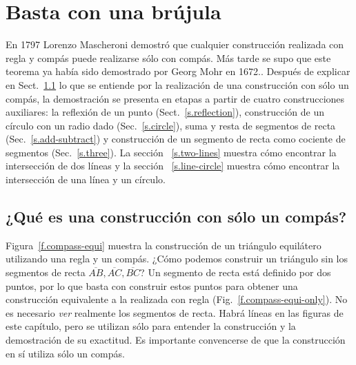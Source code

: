 
\chapter{Basta con una brújula}\label{c.compass}


En 1797 Lorenzo Mascheroni demostró que cualquier construcción realizada con regla y compás puede realizarse sólo con compás. Más tarde se supo que este teorema ya había sido demostrado por Georg Mohr en 1672..
Después de explicar en Sect.~\ref{s.compass-what} lo que se entiende por la realización de una construcción con sólo un compás, la demostración se presenta en etapas a partir de cuatro construcciones auxiliares: la reflexión de un punto (Sect.~\ref{s.reflection}), construcción de un círculo con un radio dado (Sec.~\ref{s.circle}), suma y resta de segmentos de recta (Sec.~\ref{s.add-subtract}) y construcción de un segmento de recta como cociente de segmentos (Sec.~\ref{s.three}). La sección ~\ref{s.two-lines} muestra cómo encontrar la intersección de dos líneas y la sección ~\ref{s.line-circle} muestra cómo encontrar la intersección de una línea y un círculo.

\section{¿Qué es una construcción con sólo un compás?}\label{s.compass-what}

Figura~\ref{f.compass-equi} muestra la construcción de un triángulo equilátero utilizando una regla y un compás. ¿Cómo podemos construir un triángulo sin los segmentos de recta $\overline{AB}, \overline{AC}, \overline{BC}$? Un segmento de recta está definido por dos puntos, por lo que basta con construir estos puntos para obtener una construcción equivalente a la realizada con regla (Fig.~\ref{f.compass-equi-only}). No es necesario \emph{ver} realmente los segmentos de recta.
Habrá líneas en las figuras de este capítulo, pero se utilizan sólo para entender la construcción y la demostración de su exactitud. Es importante convencerse de que la construcción en sí utiliza sólo un compás.

